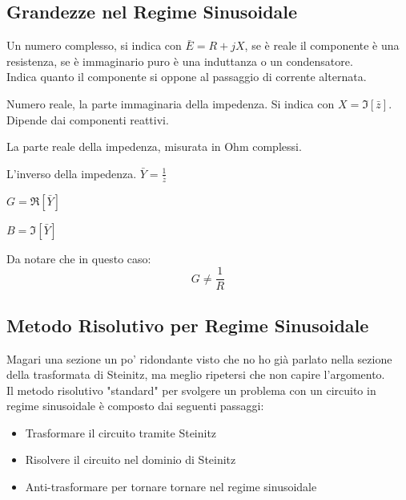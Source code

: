 \documentclass[../main.tex]{subfiles}
\begin{document}
	\subsection{Grandezze nel Regime Sinusoidale}
	\begin{definition}
		Un numero complesso, si indica con $\bar E = R+jX$, se è reale il componente è una resistenza, se è immaginario puro è una induttanza o un condensatore.\\
		Indica quanto il componente si oppone al passaggio di corrente alternata.
	\end{definition}
	\begin{definition}
		Numero reale, la parte immaginaria della impedenza. Si indica con $X=\Im[\bar z]$. \\
		Dipende dai componenti reattivi.
	\end{definition}
	\begin{definition}
		La parte reale della impedenza, misurata in Ohm complessi.
	\end{definition}
	\begin{definition}
		L'inverso della impedenza. $\bar Y = \frac{1}{\bar z}$
	\end{definition}
	\begin{definition}
		$G=\Re [\bar Y]$
	\end{definition}
	\begin{definition}
		$B=\Im [\bar Y]$
	\end{definition}
	Da notare che in questo caso:
	\begin{equation}
		G\neq \frac{1}{R}
	\end{equation}
	\subsection{Metodo Risolutivo per Regime Sinusoidale}
	Magari una sezione un po' ridondante visto che no ho già parlato nella sezione della trasformata di Steinitz, ma meglio ripetersi che non capire l'argomento.\\
	Il metodo risolutivo "standard" per svolgere un problema con un circuito in regime sinusoidale è composto dai seguenti passaggi:
	\begin{itemize}
		\item Trasformare il circuito tramite Steinitz
		\item Risolvere il circuito nel dominio di Steinitz
		\item Anti-trasformare per tornare tornare nel regime sinusoidale
	\end{itemize}
\end{document}
